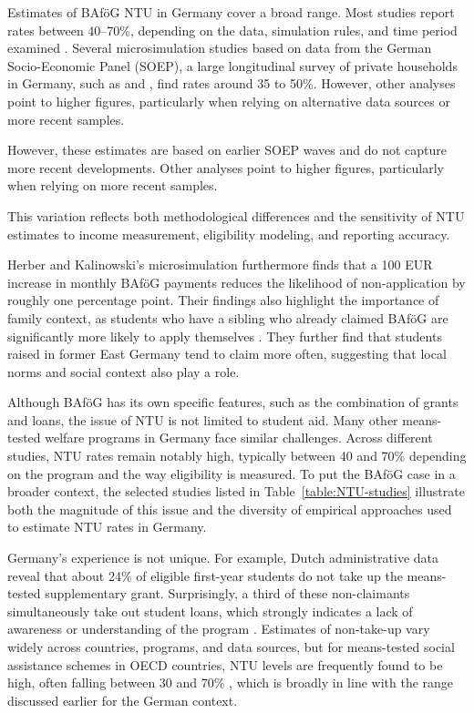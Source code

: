 Estimates of BAföG NTU in Germany cover a broad range. Most studies report rates between 40--70\%, depending on the data, simulation rules, and time period examined \citep{goedeme_concept_2020}. Several microsimulation studies based on data from the German Socio-Economic Panel (SOEP), a large longitudinal survey of private households in Germany, such as \citet{herber_non-take-up_2019} and \citet{bruckmeier_new_2012}, find rates around 35 to 50\%. However, other analyses point to higher figures, particularly when relying on alternative data sources or more recent samples. 

However, these estimates are based on earlier SOEP waves and do not capture more recent developments. Other analyses point to higher figures, particularly when relying on more recent samples. 

This variation reflects both methodological differences and the sensitivity of NTU estimates to income measurement, eligibility modeling, and reporting accuracy.

Herber and Kalinowski’s microsimulation furthermore finds that a 100 EUR increase in monthly BAföG payments reduces the likelihood of non-application by roughly one percentage point. Their findings also highlight the importance of family context, as students who have a sibling who already claimed BAföG are significantly more likely to apply themselves \citep{frick_claim_2007, bruckmeier_new_2012}. They further find that students raised in former East Germany tend to claim more often, suggesting that local norms and social context also play a role.

Although BAföG has its own specific features, such as the combination of grants and loans, the issue of NTU is not limited to student aid. Many other means-tested welfare programs in Germany face similar challenges. Across different studies, NTU rates remain notably high, typically between 40 and 70\% depending on the program and the way eligibility is measured. To put the BAföG case in a broader context, the selected studies listed in Table~\ref{table:NTU-studies} illustrate both the magnitude of this issue and the diversity of empirical approaches used to estimate NTU rates in Germany.




Germany’s experience is not unique. For example, Dutch administrative data reveal that about 24\% of eligible first-year students do not take up the means-tested supplementary grant. Surprisingly, a third of these non-claimants simultaneously take out student loans, which strongly indicates a lack of awareness or understanding of the program \citep{konijn_quantifying_2023}. Estimates of non-take-up vary widely across countries, programs, and data sources, but for means-tested social assistance schemes in OECD countries, NTU levels are frequently found to be high, often falling between 30 and 70\% \citep{goedeme_concept_2020}, which is broadly in line with the range discussed earlier for the German context.

